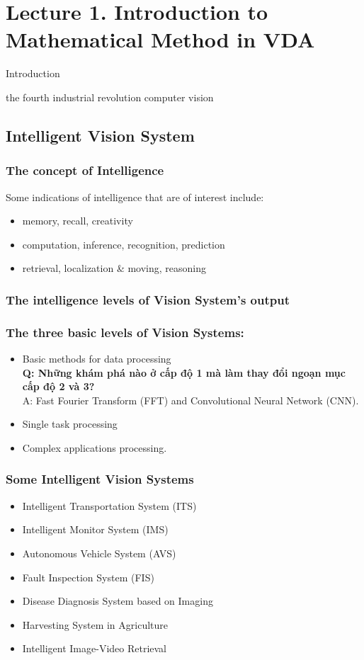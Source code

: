 \section{Lecture 1. Introduction to Mathematical Method in VDA}


Introduction

the fourth industrial revolution
computer vision 

\subsection{Intelligent Vision System}
    \subsubsection{The concept of Intelligence}
        Some indications of intelligence that are of interest include:
        \begin{itemize}
            \item memory, recall, creativity
            \item computation, inference, recognition, prediction
            \item retrieval, localization \& moving, reasoning
        \end{itemize}
    \subsubsection{The intelligence levels of Vision System's output}
    \subsubsection{The three basic levels of Vision Systems:}
    \begin{itemize}
        \item Basic methods for data processing\\
        \textbf{Q: Những khám phá nào ở cấp độ 1 mà làm thay đổi ngoạn mục cấp độ 2 và 3?}\\
        A: Fast Fourier Transform (FFT) and Convolutional Neural Network (CNN).
        \item Single task processing
        \item Complex applications processing. 
    \end{itemize}
    \subsubsection{Some Intelligent Vision Systems}
    \begin{itemize}
        \item Intelligent Transportation System (ITS)
        \item Intelligent Monitor System (IMS)
        \item Autonomous Vehicle System (AVS)
        \item Fault Inspection System (FIS)
        \item Disease Diagnosis System based on Imaging
        \item Harvesting System in Agriculture
        \item Intelligent Image-Video Retrieval
    \end{itemize}
